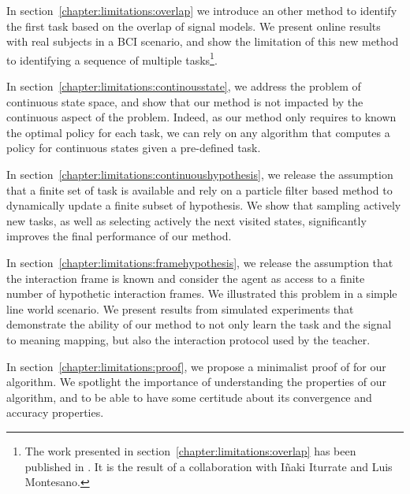 In section~\ref{chapter:limitations:overlap} we introduce an other method to identify the first task based on the overlap of signal models. We present online results with real subjects in a BCI scenario, and show the limitation of this new method to identifying a sequence of multiple tasks\footnote{The work presented in section~\ref{chapter:limitations:overlap} has been published in \cite{grizou2014calibration}. It is the result of a collaboration with I{\~n}aki Iturrate and Luis Montesano.}.

In section~\ref{chapter:limitations:continousstate}, we address the problem of continuous state space, and show that our method is not impacted by the continuous aspect of the problem. Indeed, as our method only requires to known the optimal policy for each task, we can rely on any algorithm that computes a policy for continuous states given a pre-defined task.

In section~\ref{chapter:limitations:continuoushypothesis}, we release the assumption that a finite set of task is available and rely on a particle filter based method to dynamically update a finite subset of hypothesis. We show that sampling actively new tasks, as well as selecting actively the next visited states, significantly improves the final performance of our method.

In section~\ref{chapter:limitations:framehypothesis}, we release the assumption that the interaction frame is known and consider the agent as access to a finite number of hypothetic interaction frames. We illustrated this problem in a simple line world scenario. We present results from simulated experiments that demonstrate the ability of our method to not only learn the task and the signal to meaning mapping, but also the interaction protocol used by the teacher.

In section~\ref{chapter:limitations:proof}, we propose a minimalist proof of for our algorithm. We spotlight the importance of understanding the properties of our algorithm, and to be able to have some certitude about its convergence and accuracy properties.


\newpage

\newpage

\newpage
% 

\newpage

\newpage

\newpage
% 

\newpage

